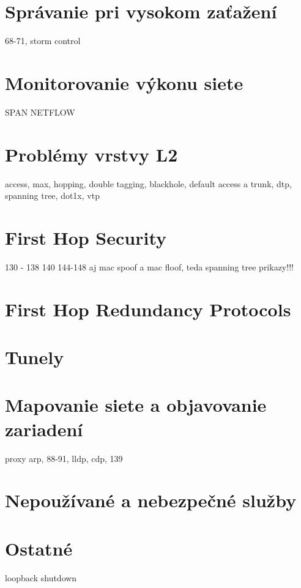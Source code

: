\section{Správanie pri vysokom zaťažení}
68-71, storm control
\section{Monitorovanie výkonu siete}
SPAN NETFLOW
\section{Problémy vrstvy L2}
access, max, hopping, double tagging, blackhole, default access a trunk, dtp, spanning tree, dot1x, vtp
\section{First Hop Security}
130 - 138 140 144-148 aj mac spoof a mac floof, teda spanning tree prikazy!!!
\section{First Hop Redundancy Protocols}
\section{}
\section{}
\section{}
\section{}
\section{}

\section{Tunely}
\section{Mapovanie siete a objavovanie zariadení}
proxy arp, 88-91, lldp, cdp, 139
\section{Nepoužívané a nebezpečné služby}
\section{Ostatné}
loopback
shutdown 
